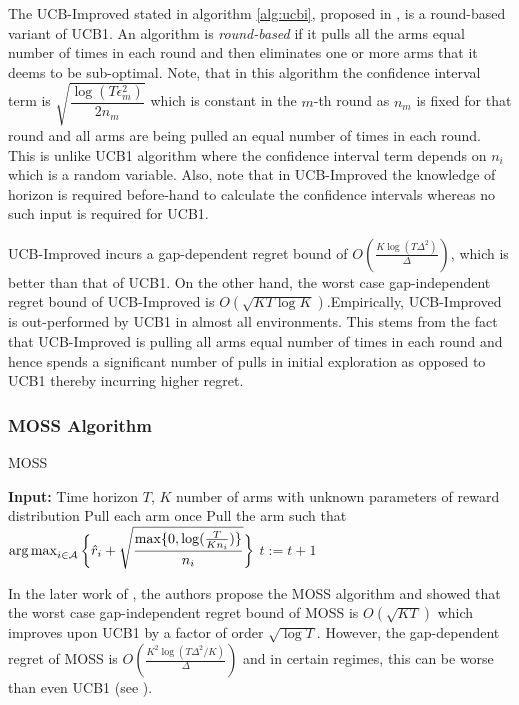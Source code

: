     The UCB-Improved  stated in algorithm \ref{alg:ucbi}, proposed in \citet{auer2010ucb}, is a round-based variant of UCB1. An algorithm is \textit{round-based} if it pulls all the arms equal number of times in each round and then eliminates one or more arms that it deems to be sub-optimal. Note, that in this algorithm the confidence interval term is $\sqrt{\dfrac{\log{( T\epsilon_{m}^{2})}}{2 n_{m}}}$ which is constant in the $m$-th round as $n_m$ is fixed for that round and all arms are being pulled an equal number of times in each round. This is unlike UCB1 algorithm where the confidence interval term depends on $n_i$ which is a random variable. Also, note that in UCB-Improved the knowledge of horizon is required before-hand to calculate the confidence intervals whereas no such input is required for UCB1.
    
    UCB-Improved incurs a gap-dependent regret bound of $O\left(\frac{K\log (T\Delta^{2})}{\Delta}\right)$, which is better than that of UCB1. On the other hand, the worst case gap-independent regret bound of UCB-Improved is $O\left(\sqrt{KT\log K}\right)$.Empirically, UCB-Improved is out-performed by UCB1 in almost all environments. This stems from the fact that UCB-Improved is pulling all arms equal number of times in each round and hence spends a significant number of pulls in initial exploration as opposed to UCB1 thereby incurring higher regret.
        
    
\subsubsection{MOSS Algorithm}    

\begin{algorithm}[!th]
\caption{MOSS}
\label{alg:moss}
\begin{algorithmic}[1]
\State \textbf{Input:} Time horizon $T$, $K$ number of arms with unknown parameters of reward distribution
\State Pull each arm once
\State Pull the arm such that $\operatorname*{arg\,max}_{i\in \mathcal{A}}\bigg\lbrace\hat{r}_{i} + \sqrt{\dfrac{\max\lbrace 0,\log(\frac{T}{K n_i})\rbrace}{n_i}}\bigg\rbrace$
\State $t:=t+1 $
 \EndFor
\end{algorithmic}
\end{algorithm}
    
    In the later work of \citet{audibert2009minimax}, the authors propose the MOSS algorithm and showed that the worst case gap-independent regret bound of MOSS is $O\left( \sqrt{KT} \right)$ which improves upon UCB1 by a factor of order $\sqrt{\log T}$. However, the gap-dependent regret of MOSS is $O\left( \frac{K^{2}\log\left(T\Delta^{2}/K\right)}{\Delta}\right)$ and in certain regimes, this can be worse than even UCB1 (see \citet{audibert2009minimax,lattimore2015optimally}).
    
